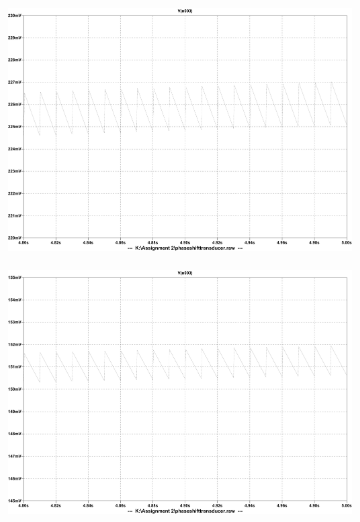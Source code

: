 \begin{figure}[!ht]
 \footnotesize
 \centering
    \begin{subfigure}[]{0.4\textwidth}
              \centering
  		\includegraphics[width=1.0\linewidth]{./Figures/ptrans_simu_1k22u.pdf}
		    \caption{} \label{subfig:ptrans_simu_1k22u}
     \end{subfigure}
          \begin{subfigure}[]{0.4\textwidth}
             \centering
  		\includegraphics[width=1.0\linewidth]{./Figures/ptrans_simu_1k33u.pdf}
		   \caption{ } \label{subfig:ptrans_simu_1k33u}
     \end{subfigure}
    \begin{subfigure}[]{0.4\textwidth}
              \centering

\end{subfigure}
\end{figure}
